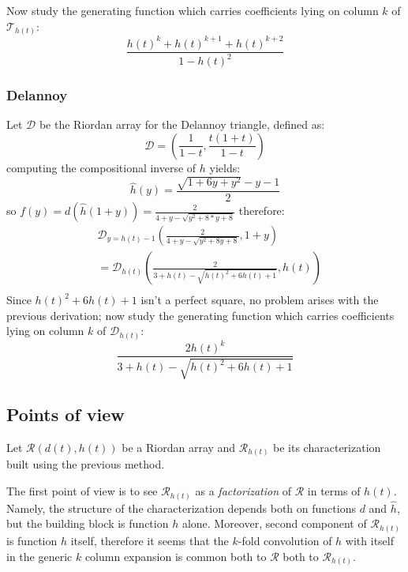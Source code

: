 Now study the generating function which carries coefficients lying on column $k$
of $\mathcal{T}_{h(t)}$:
\begin{displaymath} 
    \frac{h(t)^{k}+h(t)^{k+1}+h(t)^{k+2}}{1-h(t)^2 }
\end{displaymath} 


\subsubsection{Delannoy}

Let $\mathcal{D}$ be the Riordan array for the Delannoy triangle, defined as:
\begin{displaymath} 
    \mathcal{D} =\left( \frac{1}{1-t}, \frac{t(1+t)}{1-t}  \right)
\end{displaymath} 
computing the compositional inverse of $h$ yields:
\begin{displaymath} 
    \hat{h}(y) = \frac{\sqrt{1+6y+y^2}-y-1}{2}
\end{displaymath} 
so $f(y)=d(\hat{h}(1+y))=\frac{2}{4 + y - \sqrt{y^2 + 8*y + 8} }$ therefore:
\begin{displaymath} 
    \begin{split}
        & \mathcal{D}_{y=h(t)-1}\left( \frac{2}{4+y-\sqrt{y^2+8y+8}}, 1+y \right)\\
        &= \mathcal{D}_{h(t)}\left( \frac{2}{3+h(t)-\sqrt{h(t)^2+6h(t)+1}}, h(t) \right) \\
    \end{split}
\end{displaymath} 
Since $h(t)^2+6h(t)+1$ isn't a perfect square, no problem arises with the previous
derivation; now study the generating function which carries coefficients lying on column $k$
of $\mathcal{D}_{h(t)}$:
\begin{displaymath} 
    \frac{2h(t)^k}{3+h(t)-\sqrt{h(t)^2+6h(t)+1}}
\end{displaymath} 

\subsection{Points of view}

Let $\mathcal{R}\left(d(t),h(t)\right)$ be a Riordan array and $\mathcal{R}_{h(t)}$ be
its characterization built using the previous method.

The first point of view is to see $\mathcal{R}_{h(t)}$ as a \emph{factorization}
of $\mathcal{R}$ in terms of $h(t)$. Namely, the structure of the characterization
depends both on functions $d$ and $\hat{h}$, but the building block is function $h$
alone. Moreover, second component of $\mathcal{R}_{h(t)}$ is function $h$ itself,
therefore it seems that the $k$-fold convolution of $h$ with itself in the generic
$k$ column expansion is common both to $\mathcal{R}$ both to $\mathcal{R}_{h(t)}$.

